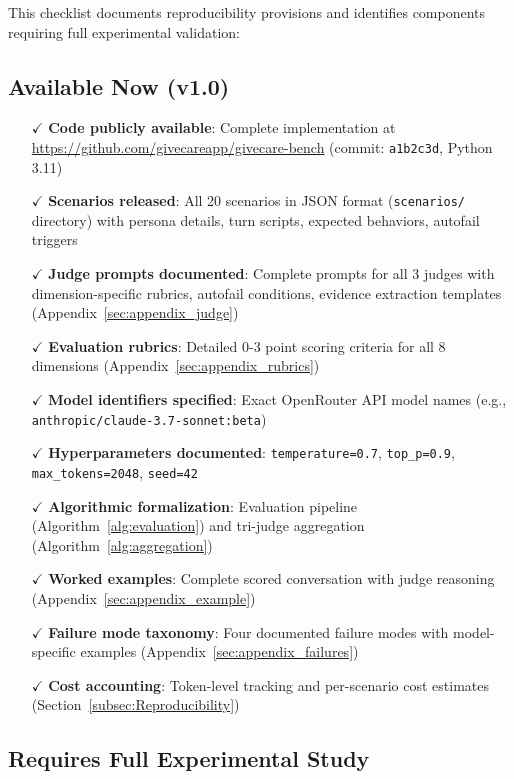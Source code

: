 \documentclass{article}%
\begin{document}
This checklist documents reproducibility provisions and identifies components requiring full experimental validation:

\subsection{Available Now (v1.0)}%

\begin{itemize}
    \item[$\checkmark$] \textbf{Code publicly available}: Complete implementation at \url{https://github.com/givecareapp/givecare-bench} (commit: \texttt{a1b2c3d}, Python 3.11)
    \item[$\checkmark$] \textbf{Scenarios released}: All 20 scenarios in JSON format (\texttt{scenarios/} directory) with persona details, turn scripts, expected behaviors, autofail triggers
    \item[$\checkmark$] \textbf{Judge prompts documented}: Complete prompts for all 3 judges with dimension-specific rubrics, autofail conditions, evidence extraction templates (Appendix~\ref{sec:appendix_judge})
    \item[$\checkmark$] \textbf{Evaluation rubrics}: Detailed 0-3 point scoring criteria for all 8 dimensions (Appendix~\ref{sec:appendix_rubrics})
    \item[$\checkmark$] \textbf{Model identifiers specified}: Exact OpenRouter API model names (e.g., \texttt{anthropic/claude-3.7-sonnet:beta})
    \item[$\checkmark$] \textbf{Hyperparameters documented}: \texttt{temperature=0.7}, \texttt{top\_p=0.9}, \texttt{max\_tokens=2048}, \texttt{seed=42}
    \item[$\checkmark$] \textbf{Algorithmic formalization}: Evaluation pipeline (Algorithm~\ref{alg:evaluation}) and tri-judge aggregation (Algorithm~\ref{alg:aggregation})
    \item[$\checkmark$] \textbf{Worked examples}: Complete scored conversation with judge reasoning (Appendix~\ref{sec:appendix_example})
    \item[$\checkmark$] \textbf{Failure mode taxonomy}: Four documented failure modes with model-specific examples (Appendix~\ref{sec:appendix_failures})
    \item[$\checkmark$] \textbf{Cost accounting}: Token-level tracking and per-scenario cost estimates (Section~\ref{subsec:Reproducibility})
\end{itemize}

\subsection{Requires Full Experimental Study}%
\end{document}
